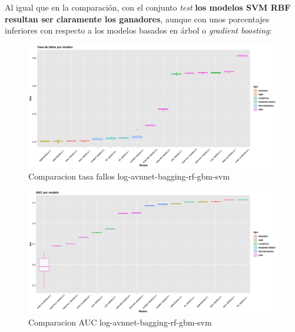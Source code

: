 \documentclass[
]{article}
\begin{document}
Al igual que en la comparación, con el conjunto \emph{test} \textbf{los
modelos SVM RBF resultan ser claramente los ganadores}, aunque con unos
porcentajes inferiores con respecto a los modelos basados en árbol o
\emph{gradient boosting}:

\begin{figure}[h!]

{\centering \includegraphics[width=0.99\linewidth,height=0.99\textheight,]{./charts/comparativas/06_log_avnnet_bagging_rf_gbm_svm_tasa} 

}

\caption{Comparacion tasa fallos log-avnnet-bagging-rf-gbm-svm}\label{fig:unnamed-chunk-128}
\end{figure}
\begin{figure}[h!]

{\centering \includegraphics[width=0.99\linewidth,height=0.99\textheight,]{./charts/comparativas/06_log_avnnet_bagging_rf_gbm_svm_auc} 

}

\caption{Comparacion AUC log-avnnet-bagging-rf-gbm-svm}\label{fig:unnamed-chunk-129}
\end{figure}
\end{document}
